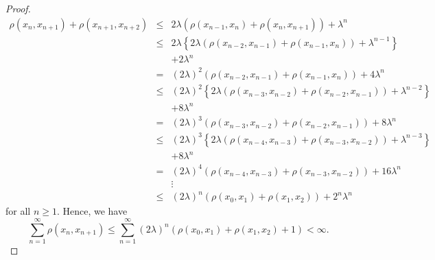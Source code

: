 \documentclass[10pt,a4paper]{amsart}
\begin{document}
\begin{proof}
\begin{eqnarray*}
\rho (x_{n},x_{n+1})+\rho (x_{n+1},x_{n+2}) &\leq &2\lambda \left( \rho
(x_{n-1},x_{n})+\rho (x_{n},x_{n+1})\right) +\lambda ^{n} \\
&\leq &2\lambda \left \{ 2\lambda \left( \rho (x_{n-2},x_{n-1})+\rho
(x_{n-1},x_{n})\right) +\lambda ^{n-1}\right \} \\
&&+2\lambda ^{n} \\
&=&\left( 2\lambda \right) ^{2}\left( \rho (x_{n-2},x_{n-1})+\rho
(x_{n-1},x_{n})\right) +4\lambda ^{n} \\
&\leq &\left( 2\lambda \right) ^{2}\left \{ 2\lambda \left( \rho
(x_{n-3},x_{n-2})+\rho (x_{n-2},x_{n-1})\right) +\lambda ^{n-2}\right \} \\
&&+8\lambda ^{n} \\
&=&\left( 2\lambda \right) ^{3}\left( \rho (x_{n-3},x_{n-2})+\rho
(x_{n-2},x_{n-1})\right) +8\lambda ^{n} \\
&\leq &\left( 2\lambda \right) ^{3}\left \{ 2\lambda \left( \rho
(x_{n-4},x_{n-3})+\rho (x_{n-3},x_{n-2})\right) +\lambda ^{n-3}\right \} \\
&&+8\lambda ^{n} \\
&=&\left( 2\lambda \right) ^{4}\left( \rho (x_{n-4},x_{n-3})+\rho
(x_{n-3},x_{n-2})\right) +16\lambda ^{n} \\
&&\vdots \\
&\leq &\left( 2\lambda \right) ^{n}\left( \rho (x_{0},x_{1})+\rho
(x_{1},x_{2})\right) +2^{n}\lambda ^{n}
\end{eqnarray*}%
for all $n\geq 1$. Hence, we have 
\begin{equation*}
\sum \limits_{n=1}^{\infty }\rho (x_{n},x_{n+1})\leq \sum
\limits_{n=1}^{\infty }\left( 2\lambda \right) ^{n}\left( \rho
(x_{0},x_{1})+\rho (x_{1},x_{2})+1\right) <\infty .
\end{equation*}


\end{proof}
\end{document}
